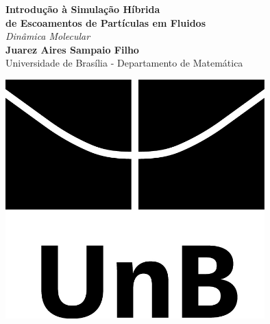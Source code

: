 \documentclass[a0,portrait]{a0poster}
\begin{document}


\begin{minipage}[b]{0.75\linewidth}
\veryHuge \color{NavyBlue} \textbf{Introdução à Simulação Híbrida\\ de
Escoamentos de 
Partículas em Fluidos} \color{Black}\\ %
\Huge\textit{Dinâmica Molecular}\\[2cm] %
\huge \textbf{Juarez Aires Sampaio Filho}\\[0.5cm] %
\huge Universidade de Brasília - Departamento de Matemática\\[0.4cm] %
\end{minipage}
%
\begin{minipage}[b]{0.25\linewidth}
\includegraphics[width = 10cm]{../images/as_vert_PB.jpg}\\
\end{minipage}

\vspace{1cm} %
\end{document}
